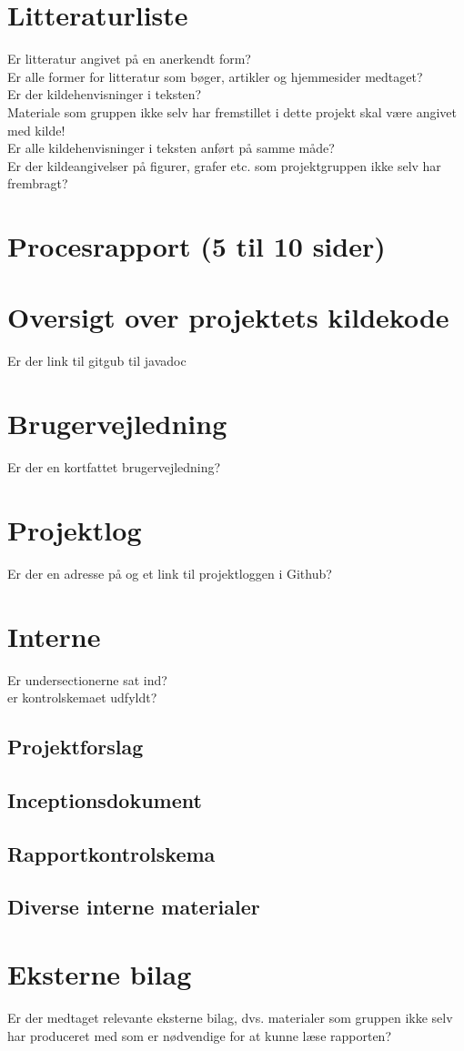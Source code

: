 \documentclass[12pt]{article}
\begin{document}
\section{Litteraturliste}
Er litteratur angivet på en anerkendt form? \\
Er alle former for litteratur som bøger, artikler og hjemmesider medtaget? \\
Er der kildehenvisninger i teksten? \\
Materiale som gruppen ikke selv har fremstillet i dette projekt skal være angivet med kilde! \\
Er alle kildehenvisninger i teksten anført på samme måde? \\
Er der kildeangivelser på figurer, grafer etc. som projektgruppen ikke selv har frembragt? \\
\pagebreak
\section{Procesrapport (5 til 10 sider)}
\setcounter{page}{1}
\section{Oversigt over projektets kildekode}
Er der link til gitgub til javadoc
\section{Brugervejledning}
Er der en kortfattet brugervejledning?
\section{Projektlog}
Er der en adresse på og et link til projektloggen i Github?
\pagebreak
\section{Interne}
Er undersectionerne sat ind?\\
er kontrolskemaet udfyldt?
\subsection{Projektforslag}

\subsection{Inceptionsdokument}

\subsection{Rapportkontrolskema}

\subsection{Diverse interne materialer}
\clearpage
\section{Eksterne bilag}

\thispagestyle{empty}
Er der medtaget relevante eksterne bilag, dvs. materialer som gruppen ikke selv har produceret med som er nødvendige for at kunne læse rapporten?
\end{document}

